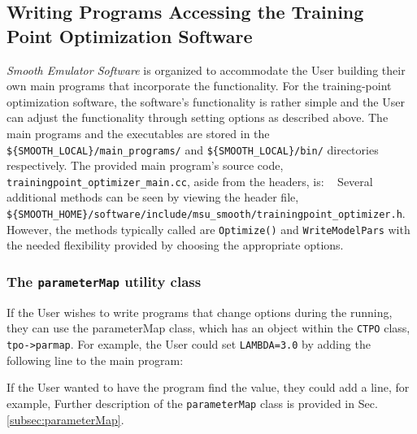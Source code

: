 \documentclass[UserManual.tex]{subfiles}
\begin{document}
\begin{sloppypar}
\subsection{Writing Programs Accessing the Training Point Optimization Software}
{\it Smooth Emulator Software} is organized to accommodate the User building their own main programs that incorporate the functionality. For the training-point optimization software, the software's functionality is rather simple and the User can adjust the functionality through setting options as described above. The main programs and the executables are stored in the {\tt \$\{SMOOTH\_LOCAL\}/main\_programs/} and {\tt \$\{SMOOTH\_LOCAL\}/bin/} directories respectively. The provided main program's source code, {\tt trainingpoint\_optimizer\_main.cc}, aside from the headers, is:
{\tt{}\vspace*{-8pt}
}
Several additional methods can be seen by viewing the header file, {\tt \$\{SMOOTH\_HOME\}/software/include/msu\_smooth/trainingpoint\_optimizer.h}. However, the methods typically called are {\tt Optimize()} and {\tt WriteModelPars} with the needed flexibility provided by choosing the appropriate options.

\subsubsection{The {\tt parameterMap} utility class}
If the User wishes to write programs that change options during the running, they can use the parameterMap class, which has an object within the {\tt CTPO} class, {\tt tpo->parmap}. For example, the User could set {\tt LAMBDA=3.0} by adding the following line to the main program:
\vspace*{-8pt}{\tt \begin{Verbatim}[commandchars=\\\{\}]
    .
   tpo->parmap.set("TPO_LAMBDA",3.0);
    .
\end{Verbatim}
}\vspace*{-8pt}

If the User wanted to have the program find the value, they could add a line, for example,
\vspace*{-8pt}{\tt \begin{Verbatim}[commandchars=\\\{\}]
    .
   int NMC=tpo->parmap.getI("TPO_NMC",0);
    .
\end{Verbatim}
}\vspace*{-8pt}
Further description of the {\tt parameterMap} class is provided in Sec. \ref{subsec:parameterMap}.

\end{sloppypar}
\end{document}
